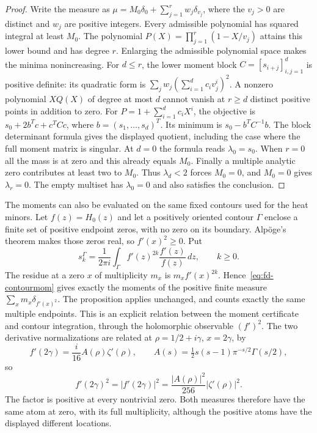 \begin{proof}
Write the measure as
$\mu=M_0\delta_0+\sum_{j=1}^r w_j\delta_{v_j}$,
where the $v_j>0$ are distinct and $w_j$ are positive integers.
Every admissible polynomial has squared integral at least $M_0$.
The polynomial $P(X)=\prod_{j=1}^r(1-X/v_j)$ attains this lower
bound and has degree $r$.  Enlarging the admissible polynomial space
makes the minima nonincreasing.
For $d\le r$, the lower moment block
$C=[s_{i+j}]_{i,j=1}^d$ is positive definite: its quadratic form is
$\sum_jw_j(\sum_{i=1}^d c_i v_j^i)^2$.
A nonzero polynomial $XQ(X)$ of degree at most $d$ cannot vanish at
$r\ge d$ distinct positive points in addition to zero.
For $P=1+\sum_{i=1}^d c_iX^i$, the objective is
$s_0+2b^Tc+c^TCc$, where $b=(s_1,\ldots,s_d)^T$.
Its minimum is $s_0-b^TC^{-1}b$.
The block determinant formula gives the displayed quotient, including
the case where the full moment matrix is singular.
At $d=0$ the formula reads $\lambda_0=s_0$.
When $r=0$ all the mass is at zero and this already equals $M_0$.
Finally a multiple analytic zero contributes at least two to $M_0$.
Thus $\lambda_d<2$ forces $M_0=0$, and $M_0=0$ gives
$\lambda_r=0$.  The empty multiset has $\lambda_0=0$ and also
satisfies the conclusion.
\end{proof}

The moments can also be evaluated on the same fixed contours used
for the heat minors.  Let $f(z)=H_0(z)$ and let a positively oriented
contour $\Gamma$ enclose a finite set of positive endpoint zeros,
with no zero on its boundary.  Alp\"oge's theorem makes those zeros
real, so $f'(x)^2\ge0$.  Put
\begin{equation}\label{eq:fd-contourmom}
 s_k^{\Gamma}=\frac1{2\pi i}\int_\Gamma
            f'(z)^{2k}\frac{f'(z)}{f(z)}\,dz,\qquad k\ge0.
\end{equation}
The residue at a zero $x$ of multiplicity $m_x$ is
$m_x f'(x)^{2k}$.  Hence~\eqref{eq:fd-contourmom} gives exactly
the moments of the positive finite measure
$\sum_xm_x\delta_{f'(x)^2}$.  The proposition applies unchanged,
and counts exactly the same multiple endpoints.
This is an explicit relation between the moment certificate and
contour integration, through the holomorphic observable $(f')^2$.
The two derivative normalizations are related at
$\rho=1/2+i\gamma$, $x=2\gamma$, by
\[
 f'(2\gamma)=\frac{i}{16}A(\rho)\zeta'(\rho),\qquad
 A(s)=\tfrac12s(s-1)\pi^{-s/2}\Gamma(s/2),
\]
so
\[
 f'(2\gamma)^2=|f'(2\gamma)|^2
             =\frac{|A(\rho)|^2}{256}|\zeta'(\rho)|^2.
\]
The factor is positive at every nontrivial zero.  Both measures
therefore have the same atom at zero, with its full multiplicity,
although the positive atoms have the displayed different locations.

